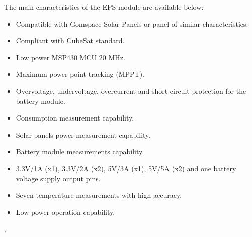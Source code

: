 The main characteristics of the EPS module are available below:

\begin{itemize}
    \item Compatible with Gomspace Solar Panels or panel of similar characteristics.
    \item Compliant with CubeSat standard.
    \item Low power MSP430 MCU \@ 20 MHz.
    \item Maximum power point tracking (MPPT).
    \item Overvoltage, undervoltage, overcurrent and short circuit protection for the battery module.
    \item Consumption measurement capability.
    \item Solar panels power measurement capability.
    \item Battery module measurements capability.
    \item 3.3V/1A (x1), 3.3V/2A (x2), 5V/3A (x1), 5V/5A (x2) and one battery voltage supply output pins.
    \item Seven temperature measurements with high accuracy.
    \item Low power operation capability.
\end{itemize}

\cite{test}, \cite{obdh2}
